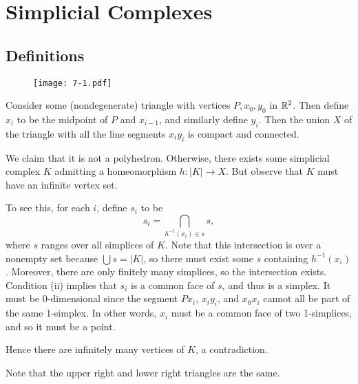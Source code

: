 \documentclass[../../solutions.tex]{subfiles}
\begin{document}
\section{Simplicial Complexes}
\subsection{Definitions}
\begin{exercise} \leavevmode
\begin{figure}[htbp]
\centering
\texttt{[image: 7-1.pdf]}
\label{fig:7-1}
\end{figure}
\end{exercise}

\begin{exercise} \leavevmode
Consider some (nondegenerate) triangle with vertices $P,x_0,y_0$ in $\mathbb{R}^2$.
Then define $x_i$ to be the midpoint of $P$ and $x_{i-1}$, and similarly define $y_i$.
Then the union $X$ of the triangle with all the line segments $x_iy_i$ is compact and connected.

We claim that it is not a polyhedron.
Otherwise, there exists some simplicial complex $K$ admitting a homeomorphism $h:|K|\to X$.
But observe that $K$ must have an infinite vertex set.

To see this, for each $i$, define $s_i$ to be
\[s_i=\bigcap_{h^{-1}(x_i)\in s}s,\]
where $s$ ranges over all simplices of $K$.
Note that this intersection is over a nonempty set because $\bigcup s=|K|$, so there must exist some $s$ containing $h^{-1}(x_i)$.
Moreover, there are only finitely many simplices, so the intersection exists.
Condition (ii) implies that $s_i$ is a common face of $s$, and thus is a simplex.
It must be 0-dimensional since the segment $Px_i$, $x_iy_i$, and $x_0x_i$ cannot all be part of the same 1-simplex.
In other words, $x_i$ must be a common face of two 1-simplices, and so it must be a point.

Hence there are infinitely many vertices of $K$, a contradiction.
\end{exercise}

\begin{exercise} \leavevmode
Note that the upper right and lower right triangles are the same.
\end{exercise}
\end{document}
